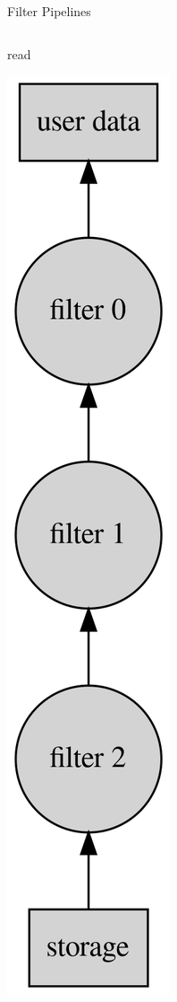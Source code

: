 \documentclass{beamer}
\begin{document}
\begin{frame}{Filter Pipelines}
\begin{columns}
    \begin{block}{read}
      \begin{center}
        \includegraphics[height=0.75\textheight]{images/read-filter-pipeline.png}
      \end{center}
    \end{block}
  \end{columns}
\end{frame}
\end{document}
